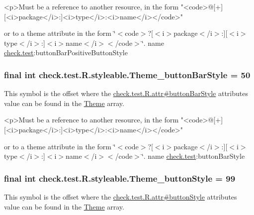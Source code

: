 \begin{DoxyVerb}      <p>Must be a reference to another resource, in the form "<code>@[+][<i>package</i>:]<i>type</i>:<i>name</i></code>"
\end{DoxyVerb}
 or to a theme attribute in the form \char`\"{}$<$code$>$?\mbox{[}$<$i$>$package$<$/i$>$\+:\mbox{]}\mbox{[}$<$i$>$type$<$/i$>$\+:\mbox{]}$<$i$>$name$<$/i$>$$<$/code$>$\char`\"{}.  name \hyperlink{namespacecheck_1_1test}{check.\+test}\+:button\+Bar\+Positive\+Button\+Style \hypertarget{classcheck_1_1test_1_1_r_1_1styleable_aef00ad24e719805177672c1be58ab494}{}
\subsubsection[{Theme\+\_\+button\+Bar\+Style}]{\setlength{\rightskip}{0pt plus 5cm}final int check.\+test.\+R.\+styleable.\+Theme\+\_\+button\+Bar\+Style = 50\hspace{0.3cm}{\ttfamily [static]}}\label{classcheck_1_1test_1_1_r_1_1styleable_aef00ad24e719805177672c1be58ab494}
This symbol is the offset where the \hyperlink{classcheck_1_1test_1_1_r_1_1attr_a42d587c40efc746d3bdd3ce6c788d5a8}{check.\+test.\+R.\+attr\#button\+Bar\+Style} attribute\textquotesingle{}s value can be found in the \hyperlink{classcheck_1_1test_1_1_r_1_1styleable_acca726d02016a0cf607782ec3a436a81}{Theme} array.

\begin{DoxyVerb}      <p>Must be a reference to another resource, in the form "<code>@[+][<i>package</i>:]<i>type</i>:<i>name</i></code>"
\end{DoxyVerb}
 or to a theme attribute in the form \char`\"{}$<$code$>$?\mbox{[}$<$i$>$package$<$/i$>$\+:\mbox{]}\mbox{[}$<$i$>$type$<$/i$>$\+:\mbox{]}$<$i$>$name$<$/i$>$$<$/code$>$\char`\"{}.  name \hyperlink{namespacecheck_1_1test}{check.\+test}\+:button\+Bar\+Style \hypertarget{classcheck_1_1test_1_1_r_1_1styleable_af32f3514cf5d1f07163a1a7b6adf5022}{}
\subsubsection[{Theme\+\_\+button\+Style}]{\setlength{\rightskip}{0pt plus 5cm}final int check.\+test.\+R.\+styleable.\+Theme\+\_\+button\+Style = 99\hspace{0.3cm}{\ttfamily [static]}}\label{classcheck_1_1test_1_1_r_1_1styleable_af32f3514cf5d1f07163a1a7b6adf5022}
This symbol is the offset where the \hyperlink{classcheck_1_1test_1_1_r_1_1attr_aeed7bf89db114a56c67e851d7bc203e4}{check.\+test.\+R.\+attr\#button\+Style} attribute\textquotesingle{}s value can be found in the \hyperlink{classcheck_1_1test_1_1_r_1_1styleable_acca726d02016a0cf607782ec3a436a81}{Theme} array.

